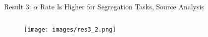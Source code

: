 \begin{frame}{Result 3: $\alpha$ Rate Is Higher for Segregation Tasks, Source Analysis}
    \begin{columns}

        \begin{column}{0.6\textwidth}
            \begin{figure}\label{fig:res3_2}
            \centering
            \texttt{[image: images/res3\_2.png]}
            \end{figure}
        \end{column}
        
        \begin{column}{0.35\textwidth}
    
        
        \end{column}
        \end{columns}
    
\end{frame}

